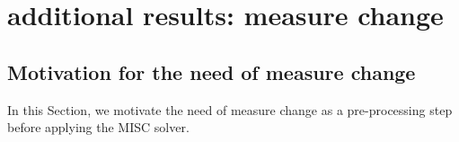 \documentclass[11pt]{article}
\begin{document}
%
%
%


 

 \section{additional results: measure change}\label{appendix:additional results: measure change}
 
 \subsection{Motivation for the need of measure change}\label{sec:Motivation for the need of measure change}
 In this Section, we motivate the need of measure change as a pre-processing step before applying the MISC solver.
\end{document}
